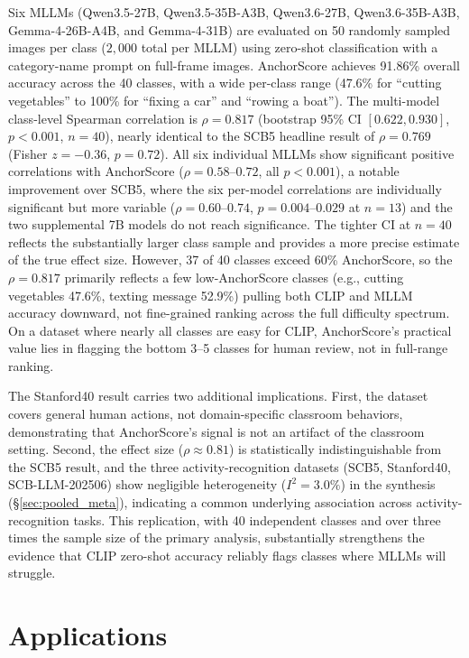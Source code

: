 \documentclass[11pt,a4paper]{article}
\begin{document}
Six MLLMs (Qwen3.5-27B, Qwen3.5-35B-A3B, Qwen3.6-27B, Qwen3.6-35B-A3B, Gemma-4-26B-A4B, and Gemma-4-31B) are evaluated on 50 randomly sampled images per class ($2{,}000$ total per MLLM) using zero-shot classification with a category-name prompt on full-frame images. AnchorScore achieves 91.86\% overall accuracy across the 40 classes, with a wide per-class range (47.6\% for ``cutting vegetables'' to 100\% for ``fixing a car'' and ``rowing a boat''). The multi-model class-level Spearman correlation is $\rho=0.817$ (bootstrap 95\% CI $[0.622, 0.930]$, $p<0.001$, $n=40$), nearly identical to the SCB5 headline result of $\rho=0.769$ (Fisher $z=-0.36$, $p=0.72$). All six individual MLLMs show significant positive correlations with AnchorScore ($\rho=0.58$--$0.72$, all $p<0.001$), a notable improvement over SCB5, where the six per-model correlations are individually significant but more variable ($\rho=0.60$--$0.74$, $p=0.004$--$0.029$ at $n=13$) and the two supplemental 7B models do not reach significance. The tighter CI at $n=40$ reflects the substantially larger class sample and provides a more precise estimate of the true effect size. However, 37 of 40 classes exceed 60\% AnchorScore, so the $\rho=0.817$ primarily reflects a few low-AnchorScore classes (e.g., cutting vegetables 47.6\%, texting message 52.9\%) pulling both CLIP and MLLM accuracy downward, not fine-grained ranking across the full difficulty spectrum. On a dataset where nearly all classes are easy for CLIP, AnchorScore's practical value lies in flagging the bottom 3--5 classes for human review, not in full-range ranking.

The Stanford40 result carries two additional implications. First, the dataset covers general human actions, not domain-specific classroom behaviors, demonstrating that AnchorScore's signal is not an artifact of the classroom setting. Second, the effect size ($\rho\approx0.81$) is statistically indistinguishable from the SCB5 result, and the three activity-recognition datasets (SCB5, Stanford40, SCB-LLM-202506) show negligible heterogeneity ($I^2=3.0\%$) in the synthesis (\S\ref{sec:pooled_meta}), indicating a common underlying association across activity-recognition tasks. This replication, with 40 independent classes and over three times the sample size of the primary analysis, substantially strengthens the evidence that CLIP zero-shot accuracy reliably flags classes where MLLMs will struggle.

\section{Applications}
\label{sec:applications}
\end{document}
